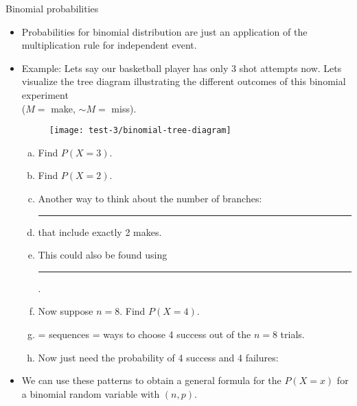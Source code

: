 \documentclass{article}
\newcommand{\blankul}[1]{\rule[-1.5mm]{#1}{0.15mm}}	%
\newcommand{\comp}{{\sim}}		%
\begin{document}
Binomial probabilities\bigskip
\begin{itemize}
    \item Probabilities for binomial distribution are just an application of the multiplication rule for independent event.
    \item Example: Lets say our basketball player has only 3 shot attempts now. Lets visualize the tree diagram illustrating the different outcomes of this binomial experiment\\ ($M = $ make, $\comp{M} = $ miss).
    \begin{figure}[H]
        \center\texttt{[image: test-3/binomial-tree-diagram]}
    \end{figure}
    \begin{enumerate}[(a)]
        \item Find $P(X = 3)$.\vspace{50pt}
        \item Find $P(X = 2)$.\vspace{50pt}
        \item[] Another way to think about the number of branches:
        \item[] \blankul{3cm} that include exactly 2 makes.
        \item[] This could also be found using \blankul{4cm}.
        \item Now suppose $n = 8$. Find $P(X = 4)$.
        \item[] \hspace{10pt} = \hspace{10pt} sequences = \hspace{10pt} ways to choose 4 success out of the $n = 8$ trials.
        \item[] Now just need the probability of 4 success and 4 failures:\vspace{30pt}
    \end{enumerate}
    \item We can use these patterns to obtain a general formula for the $P(X = x)$ for a binomial random variable with $(n, p)$.
\end{itemize}\bigskip
\end{document}

